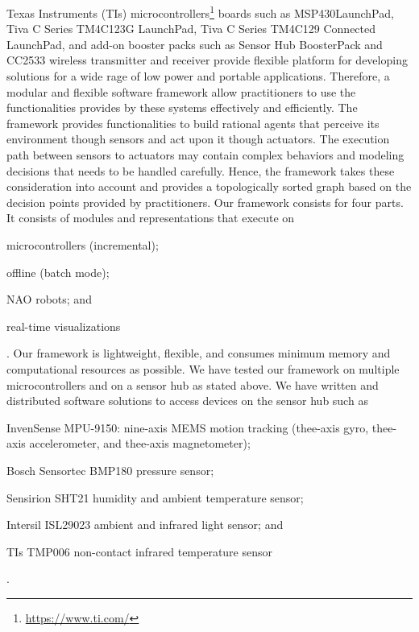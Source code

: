 \documentclass[letterpaper]{article}
\begin{document}
Texas Instruments (TIs) microcontrollers\footnote{\url{https://www.ti.com/}}  boards such 
as MSP430{\texttrademark}LaunchPad, Tiva{\texttrademark} C Series TM4C123G
LaunchPad, Tiva C Series 
TM4C129 Connected LaunchPad, and add-on booster packs such as Sensor Hub BoosterPack and CC2533 
wireless transmitter and 
receiver  provide flexible platform for developing solutions for a wide rage of low power 
and portable applications. 
Therefore, a modular and flexible software framework allow practitioners to use the functionalities 
provides by these systems effectively and efficiently. The framework provides functionalities to 
build  rational agents that perceive its environment though sensors and act upon it though 
actuators. The execution path between sensors to actuators may contain complex behaviors and 
modeling decisions that needs to be handled carefully. Hence, the framework takes these 
consideration into account and provides a topologically sorted graph based on the decision points 
provided by practitioners. Our framework consists for four parts. It consists of modules and 
representations that execute on \begin{inparaenum}[(1)]\item microcontrollers (incremental); \item 
offline (batch mode); \item NAO robots; and \item real-time visualizations\end{inparaenum}. Our 
framework is lightweight, flexible, and consumes minimum memory and computational resources as 
possible. We have tested our framework on multiple microcontrollers and on a sensor hub as stated 
above. We have written and distributed  software solutions to access devices on the sensor hub such 
as \begin{inparaenum}[(1)] \item InvenSense MPU-9150: nine-axis MEMS motion tracking (thee-axis 
gyro, thee-axis accelerometer, and thee-axis magnetometer); \item Bosch Sensortec BMP180 pressure 
sensor; \item Sensirion SHT21 humidity and ambient temperature sensor; \item Intersil ISL29023 
ambient and infrared light sensor; and \item TIs TMP006 non-contact infrared temperature 
sensor\end{inparaenum}.
\end{document}
